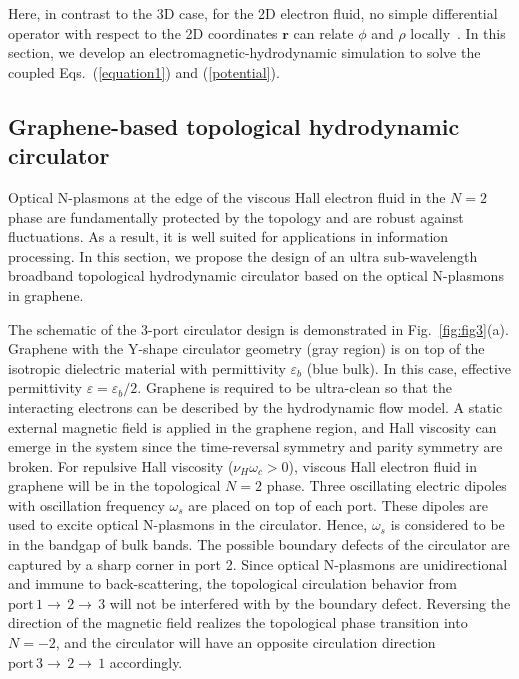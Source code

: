 \documentclass[%
reprint,
amsmath,amssymb,
aps,superscriptaddress
]{revtex4-2}
\begin{document}
Here, in contrast to the 3D case, for the 2D electron fluid, no simple differential operator with respect to the 2D coordinates $\mathbf{r}$ can relate $\phi$ and $\rho$ locally~\cite{fetter1985edge}. In this section, we develop an electromagnetic-hydrodynamic simulation to solve the coupled Eqs.~(\ref{equation1}) and (\ref{potential}).

\subsection{Graphene-based topological hydrodynamic circulator}\label{subsection3_2}

Optical N-plasmons at the edge of the viscous Hall electron fluid in the $N=2$ phase are fundamentally protected by the topology and are robust against fluctuations. As a result, it is well suited for applications in information processing. In this section, we propose the design of an ultra sub-wavelength broadband topological hydrodynamic circulator based on the optical N-plasmons in graphene.

The schematic of the 3-port circulator design is demonstrated in Fig.~\ref{fig:fig3}(a). Graphene with the Y-shape circulator geometry (gray region) is on top of the isotropic dielectric material with permittivity $\varepsilon_b$ (blue bulk). In this case, effective permittivity $\varepsilon=\varepsilon_b/2$. Graphene is required to be ultra-clean so that the interacting electrons can be described by the hydrodynamic flow model. A static external magnetic field is applied in the graphene region, and Hall viscosity can emerge in the system since the time-reversal symmetry and parity symmetry are broken. For repulsive Hall viscosity ($\nu_H \omega_c >0$), viscous Hall electron fluid in graphene will be in the topological $N=2$ phase. Three oscillating electric dipoles with oscillation frequency $\omega_s$ are placed on top of each port. These dipoles are used to excite optical N-plasmons in the circulator. Hence, $\omega_s$ is considered to be in the bandgap of bulk bands. The possible boundary defects of the circulator are captured by a sharp corner in port 2. Since optical N-plasmons are unidirectional and immune to back-scattering, the topological circulation behavior from $\mathrm{port}\, 1 \rightarrow \, 2 \rightarrow \, 3$ will not be interfered with by the boundary defect. Reversing the direction of the magnetic field realizes the topological phase transition into $N=-2$, and the circulator will have an opposite circulation direction $\mathrm{port}\, 3 \rightarrow \, 2 \rightarrow \, 1$ accordingly.
\end{document}
